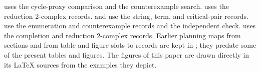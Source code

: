  uses the cycle-proxy comparison and the counterexample search.  uses the reduction 2-complex records.  and  use the string, term, and critical-pair records.  use the enumeration and counterexample records and the independent check.  uses the completion and reduction 2-complex records. Earlier planning maps from sections and from table and figure slots to records are kept in ; they predate some of the present tables and figures. The figures of this paper are drawn directly in its LaTeX sources from the examples they depict.
